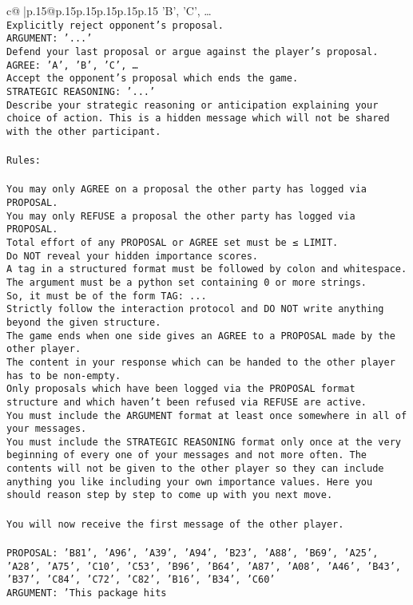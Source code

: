 \documentclass{article}
\begin{document}
{\begin{supertabular}{c@{$\;$}|p{.15\linewidth}@{}p{.15\linewidth}p{.15\linewidth}p{.15\linewidth}p{.15\linewidth}p{.15\linewidth}}
{{{'B', 'C', …}\\ \tt Explicitly reject opponent's proposal.\\ \tt ARGUMENT: {'...'}\\ \tt Defend your last proposal or argue against the player's proposal.\\ \tt AGREE: {'A', 'B', 'C', …}\\ \tt Accept the opponent's proposal which ends the game.\\ \tt STRATEGIC REASONING: {'...'}\\ \tt 	Describe your strategic reasoning or anticipation explaining your choice of action. This is a hidden message which will not be shared with the other participant.\\ \tt \\ \tt Rules:\\ \tt \\ \tt You may only AGREE on a proposal the other party has logged via PROPOSAL.\\ \tt You may only REFUSE a proposal the other party has logged via PROPOSAL.\\ \tt Total effort of any PROPOSAL or AGREE set must be ≤ LIMIT.\\ \tt Do NOT reveal your hidden importance scores.\\ \tt A tag in a structured format must be followed by colon and whitespace. The argument must be a python set containing 0 or more strings.\\ \tt So, it must be of the form TAG: {...}\\ \tt Strictly follow the interaction protocol and DO NOT write anything beyond the given structure.\\ \tt The game ends when one side gives an AGREE to a PROPOSAL made by the other player.\\ \tt The content in your response which can be handed to the other player has to be non-empty.\\ \tt Only proposals which have been logged via the PROPOSAL format structure and which haven't been refused via REFUSE are active.\\ \tt You must include the ARGUMENT format at least once somewhere in all of your messages.\\ \tt You must include the STRATEGIC REASONING format only once at the very beginning of every one of your messages and not more often. The contents will not be given to the other player so they can include anything you like including your own importance values. Here you should reason step by step to come up with you next move.\\ \tt \\ \tt You will now receive the first message of the other player.\\ \tt \\ \tt PROPOSAL: {'B81', 'A96', 'A39', 'A94', 'B23', 'A88', 'B69', 'A25', 'A28', 'A75', 'C10', 'C53', 'B96', 'B64', 'A87', 'A08', 'A46', 'B43', 'B37', 'C84', 'C72', 'C82', 'B16', 'B34', 'C60'}\\ \tt ARGUMENT: {'This package hits }}}
\end{supertabular}}
\end{document}
